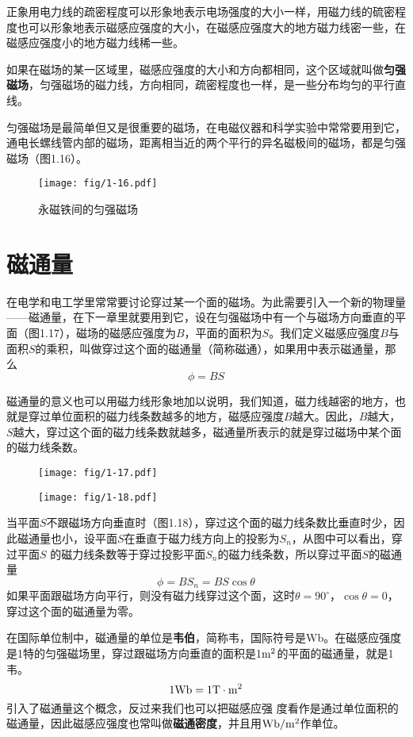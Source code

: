 正象用电力线的疏密程度可以形象地表示电场强度的大小一样，用磁力线的硫密程度也可以形象地表示磁感应强度的大小，在磁感应强度大的地方磁力线密一些，在磁感应强度小的地方磁力线稀一些。

如果在磁场的某一区域里，磁感应强度的大小和方向都相同，这个区域就叫做\textbf{匀强磁场}，匀强磁场的磁力线，方向相同，疏密程度也一样，是一些分布均匀的平行直线。

匀强磁场是最简单但又是很重要的磁场，在电磁仪器和科学实验中常常要用到它，通电长螺线管内部的磁场，距离相当近的两个平行的异名磁极间的磁场，都是匀强磁场（图1.16）。

\begin{figure}[htp]\centering
\texttt{[image: fig/1-16.pdf]}
\caption{永磁铁间的匀强磁场}
\end{figure}

\section{磁通量}
在电学和电工学里常常要讨论穿过某一个面的磁场。为此需要引入一个新的物理量——磁通量，在下一章里就要用到它，设在匀强磁场中有一个与磁场方向垂直的平面（图1.17），磁场的磁感应强度为$B$，平面的面积为$S$。我们定义磁感应强度$B$与面积$S$的乘积，叫做穿过这个面的磁通量（简称磁通），如果用中表示磁通量，那么
\[\phi=BS \]

磁通量的意义也可以用磁力线形象地加以说明，我们知道，磁力线越密的地方，也就是穿过单位面积的磁力线条数越多的地方，磁感应强度$B$越大。因此，$B$越大，$S$越大，穿过这个面的磁力线条数就越多，磁通量所表示的就是穿过磁场中某个面的磁力线条数。

\begin{figure}[htp]
\centering
\begin{minipage}[t]{0.48\textwidth}
\centering
\texttt{[image: fig/1-17.pdf]}
\caption{}
\end{minipage}
\begin{minipage}[t]{0.48\textwidth}
\centering
\texttt{[image: fig/1-18.pdf]}
\caption{}
\end{minipage}
\end{figure}


当平面$S$不跟磁场方向垂直时（图1.18），穿过这个面的磁力线条数比垂直时少，因此磁通量也小，设平面$S$在垂直于磁力线方向上的投影为$S_n$，从图中可以看出，穿过平面$S$
的磁力线条数等于穿过投影平面$S_n$的磁力线条数，所以穿过平面$S$的磁通量
\[\phi=BS_n=BS\cos\theta\]
如果平面跟磁场方向平行，则没有磁力线穿过这个面，这时$\theta=90^\circ$，$\cos\theta=0$，穿过这个面的磁通量为零。

在国际单位制中，磁通量的单位是\textbf{韦伯}，简称韦，国际符号是Wb。在磁感应强度是1特的匀强磁场里，穿过跟磁场方向垂直的面积是1${\rm m^2}$的平面的磁通量，就是1韦。
\[1{\rm Wb}=1{\rm T\cdot m^2}\]
引入了磁通量这个概念，反过来我们也可以把磁感应强
度看作是通过单位面积的磁通量，因此磁感应强度也常叫做\textbf{磁通密度}，并且用${\rm Wb}/{\rm m^2}$作单位。

